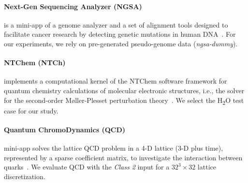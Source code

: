 \paragraph{Next-Gen Sequencing Analyzer (NGSA)} is a mini-app of a genome analyzer and a set of
alignment tools designed to facilitate cancer research by detecting genetic mutations in
human DNA~\cite{riken_csrp_grand_2013}.
For our experiments, we rely on pre-generated pseudo-genome data (\textit{ngsa-dummy}).

\paragraph{NTChem (NTCh)} implements a computational kernel of the NTChem software framework
for quantum chemistry calculations of molecular electronic structures, i.e., the solver for the
second-order M{\o}ller-Plesset perturbation theory~\cite{nakajima_ntchem:_2014}. We select the
H\textsubscript{2}O test case for our study.

\paragraph{Quantum ChromoDynamics (QCD)} mini-app solves the lattice QCD problem in a 4-D
lattice (3-D plus time), represented by a sparse coefficient matrix, to investigate the
interaction between quarks~\cite{boku_multi-block/multi-core_2012}. We evaluate QCD with the \textit{Class 2}
input for a $32^3 \times 32$ lattice discretization.


